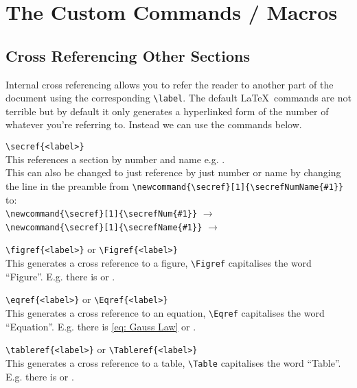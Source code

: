 \documentclass[a4paper, 12pt, english]{article}
\begin{document}
    \newpage

    \section{The Custom Commands / Macros}
        \label{sec: custom commands}

        \subsection{Cross Referencing Other Sections}
            \label{subsec: cross referencing}

            Internal cross referencing allows you to refer the reader to another part of the document using the corresponding \verb+\label+. The default \LaTeX~commands are not terrible but by default it only generates a hyperlinked form of the number of whatever you're referring to. Instead we can use the commands below.

            \verb+\secref{<label>}+\\
            This references a section by number and name e.g. .\\
            This can also be changed to just reference by just number or name by changing the line in the preamble from \verb+\newcommand{\secref}[1]{\secrefNumName{#1}}+ to:\\
            \verb+\newcommand{\secref}[1]{\secrefNum{#1}}+ $\rightarrow$ \\
            \verb+\newcommand{\secref}[1]{\secrefName{#1}}+ $\rightarrow$ 
            
            \verb+\figref{<label>}+ or \verb+\Figref{<label>}+\\
            This generates a cross reference to a figure, \verb+\Figref+ capitalises the word ``Figure''. E.g. there is  or .

            \verb+\eqref{<label>}+ or \verb+\Eqref{<label>}+\\
            This generates a cross reference to an equation, \verb+\Eqref+ capitalises the word ``Equation''. E.g. there is \eqref{eq: Gauss Law} or .

            \verb+\tableref{<label>}+ or \verb+\Tableref{<label>}+\\
            This generates a cross reference to a table, \verb+\Table+ capitalises the word ``Table''. E.g. there is  or .
\end{document}
